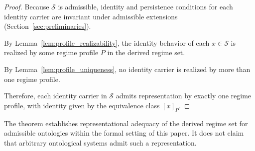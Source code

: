 \begin{proof}
Because $\mathcal{S}$ is admissible,
identity and persistence conditions for each identity carrier
are invariant under admissible extensions
(Section~\ref{sec:preliminaries}).

By Lemma~\ref{lem:profile_realizability},
the identity behavior of each $x \in \mathcal{S}$
is realized by some regime profile $P$
in the derived regime set.

By Lemma~\ref{lem:profile_uniqueness},
no identity carrier is realized by more than one regime profile.

Therefore, each identity carrier in $\mathcal{S}$
admits representation by exactly one regime profile,
with identity given by the equivalence class $[x]_P$.
\end{proof}


The theorem establishes representational adequacy of the derived regime set
for admissible ontologies within the formal setting of this paper.
It does not claim that arbitrary ontological systems admit such a representation.


